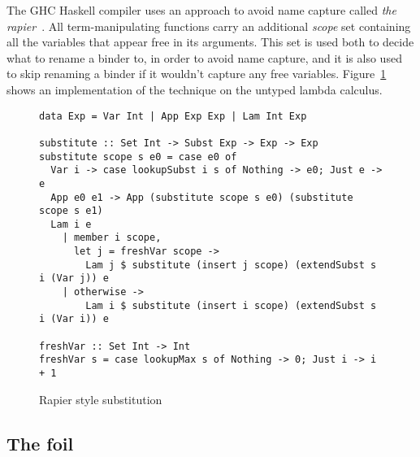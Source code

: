 \documentclass[sigconf, anonymous, review]{acmart}
\begin{document}
The GHC Haskell compiler uses an approach to avoid name capture called
\textit{the rapier}~\cite{peytonjones02secrets}. All term-manipulating functions
carry an additional \textit{scope} set containing all the
variables that appear free in its arguments. This set is
used both to decide what to rename a binder to, in order to avoid name capture,
and it is also used to skip renaming a binder if it wouldn't capture any free
variables. Figure~\ref{rapier-style-substitution} shows an implementation of the
technique on the untyped lambda calculus.

\begin{figure}
\begin{verbatim}
data Exp = Var Int | App Exp Exp | Lam Int Exp

substitute :: Set Int -> Subst Exp -> Exp -> Exp
substitute scope s e0 = case e0 of
  Var i -> case lookupSubst i s of Nothing -> e0; Just e -> e
  App e0 e1 -> App (substitute scope s e0) (substitute scope s e1)
  Lam i e
    | member i scope,
      let j = freshVar scope ->
        Lam j $ substitute (insert j scope) (extendSubst s i (Var j)) e
    | otherwise ->
        Lam i $ substitute (insert i scope) (extendSubst s i (Var i)) e

freshVar :: Set Int -> Int
freshVar s = case lookupMax s of Nothing -> 0; Just i -> i + 1
\end{verbatim}
\caption{Rapier style substitution}
\label{rapier-style-substitution}
\end{figure}

\subsection{The foil}
\label{the-rapier-with-stronger-types}
\end{document}
